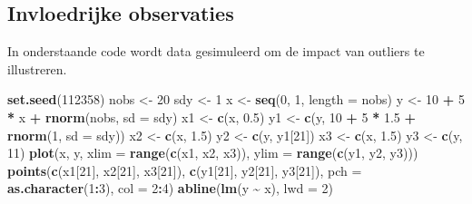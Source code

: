 \documentclass[
  12pt,dutch]{book}
\newenvironment{Shaded}{\begin{snugshade}}{\end{snugshade}}
\newcommand{\AttributeTok}[1]{\textcolor[rgb]{0.13,0.29,0.53}{#1}}
\newcommand{\DecValTok}[1]{\textcolor[rgb]{0.00,0.00,0.81}{#1}}
\newcommand{\FloatTok}[1]{\textcolor[rgb]{0.00,0.00,0.81}{#1}}
\newcommand{\FunctionTok}[1]{\textcolor[rgb]{0.13,0.29,0.53}{\textbf{#1}}}
\newcommand{\NormalTok}[1]{#1}
\newcommand{\OtherTok}[1]{\textcolor[rgb]{0.56,0.35,0.01}{#1}}
\newcommand{\SpecialCharTok}[1]{\textcolor[rgb]{0.81,0.36,0.00}{\textbf{#1}}}
\theoremstyle{definition}
\theoremstyle{definition}
\theoremstyle{definition}
\theoremstyle{definition}
\theoremstyle{remark}
\begin{document}
\subsection{Invloedrijke observaties}\label{invloedrijke-observaties}

In onderstaande code wordt data gesimuleerd om de impact van outliers te illustreren.

\begin{Shaded}
\begin{Highlighting}[]
\FunctionTok{set.seed}\NormalTok{(}\DecValTok{112358}\NormalTok{)}
\NormalTok{nobs }\OtherTok{\textless{}{-}} \DecValTok{20}
\NormalTok{sdy }\OtherTok{\textless{}{-}} \DecValTok{1}
\NormalTok{x }\OtherTok{\textless{}{-}} \FunctionTok{seq}\NormalTok{(}\DecValTok{0}\NormalTok{, }\DecValTok{1}\NormalTok{, }\AttributeTok{length =}\NormalTok{ nobs)}
\NormalTok{y }\OtherTok{\textless{}{-}} \DecValTok{10} \SpecialCharTok{+} \DecValTok{5} \SpecialCharTok{*}\NormalTok{ x }\SpecialCharTok{+} \FunctionTok{rnorm}\NormalTok{(nobs, }\AttributeTok{sd =}\NormalTok{ sdy)}
\NormalTok{x1 }\OtherTok{\textless{}{-}} \FunctionTok{c}\NormalTok{(x, }\FloatTok{0.5}\NormalTok{)}
\NormalTok{y1 }\OtherTok{\textless{}{-}} \FunctionTok{c}\NormalTok{(y, }\DecValTok{10} \SpecialCharTok{+} \DecValTok{5} \SpecialCharTok{*} \FloatTok{1.5} \SpecialCharTok{+} \FunctionTok{rnorm}\NormalTok{(}\DecValTok{1}\NormalTok{, }\AttributeTok{sd =}\NormalTok{ sdy))}
\NormalTok{x2 }\OtherTok{\textless{}{-}} \FunctionTok{c}\NormalTok{(x, }\FloatTok{1.5}\NormalTok{)}
\NormalTok{y2 }\OtherTok{\textless{}{-}} \FunctionTok{c}\NormalTok{(y, y1[}\DecValTok{21}\NormalTok{])}
\NormalTok{x3 }\OtherTok{\textless{}{-}} \FunctionTok{c}\NormalTok{(x, }\FloatTok{1.5}\NormalTok{)}
\NormalTok{y3 }\OtherTok{\textless{}{-}} \FunctionTok{c}\NormalTok{(y, }\DecValTok{11}\NormalTok{)}
\FunctionTok{plot}\NormalTok{(x, y, }\AttributeTok{xlim =} \FunctionTok{range}\NormalTok{(}\FunctionTok{c}\NormalTok{(x1, x2, x3)), }\AttributeTok{ylim =} \FunctionTok{range}\NormalTok{(}\FunctionTok{c}\NormalTok{(y1,}
\NormalTok{    y2, y3)))}
\FunctionTok{points}\NormalTok{(}\FunctionTok{c}\NormalTok{(x1[}\DecValTok{21}\NormalTok{], x2[}\DecValTok{21}\NormalTok{], x3[}\DecValTok{21}\NormalTok{]), }\FunctionTok{c}\NormalTok{(y1[}\DecValTok{21}\NormalTok{], y2[}\DecValTok{21}\NormalTok{],}
\NormalTok{    y3[}\DecValTok{21}\NormalTok{]), }\AttributeTok{pch =} \FunctionTok{as.character}\NormalTok{(}\DecValTok{1}\SpecialCharTok{:}\DecValTok{3}\NormalTok{), }\AttributeTok{col =} \DecValTok{2}\SpecialCharTok{:}\DecValTok{4}\NormalTok{)}
\FunctionTok{abline}\NormalTok{(}\FunctionTok{lm}\NormalTok{(y }\SpecialCharTok{\textasciitilde{}}\NormalTok{ x), }\AttributeTok{lwd =} \DecValTok{2}\NormalTok{)}

\end{Highlighting}
\end{Shaded}
\end{document}
